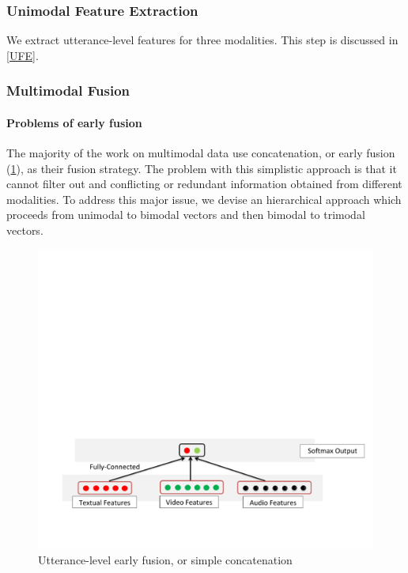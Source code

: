 \documentclass[review]{elsarticle}
\newcommand\?[1]{\hl{#1}}
\begin{document}
\subsubsection{Unimodal Feature Extraction}
We extract utterance-level features for three modalities. This step is discussed
in \cref{UFE}.

\subsubsection{Multimodal Fusion}

\paragraph{Problems of early fusion}
The majority of the work on multimodal data use concatenation, or early fusion
(\cref{fig:early_fusion}), as their fusion strategy. The problem with this
simplistic approach is that it cannot filter out and conflicting or redundant
information obtained from different modalities. To address this major issue, we
devise an hierarchical approach which proceeds from unimodal to bimodal vectors
and then bimodal to trimodal vectors.

\begin{figure}[ht]
    \centering
    \includegraphics[scale=0.46]{./hfusion-concatenation-trimmed.pdf}
    \caption{Utterance-level early fusion, or simple concatenation}
    \label{fig:early_fusion}
\end{figure}
\end{document}
